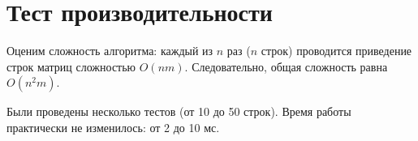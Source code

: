  
\section{Тест производительности}

Оценим сложность алгоритма: каждый из $n$ раз ($n$ строк) проводится приведение строк матриц сложностью $O(nm)$. Следовательно, общая сложность равна $O(n^2 m)$.

Были проведены несколько тестов (от 10 до 50 строк). Время работы практически не изменилось: от 2 до 10 мс.
\pagebreak